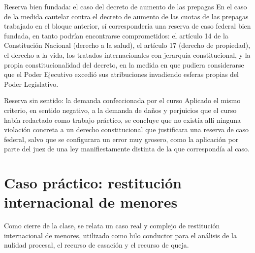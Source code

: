 \documentclass[12pt,oneside]{book}
\begin{document}
\begin{example}{Reserva bien fundada: el caso del decreto de aumento de las prepagas}
En el caso de la medida cautelar contra el decreto de aumento de las cuotas de las prepagas trabajado en el bloque anterior, sí correspondería una reserva de caso federal bien fundada, en tanto podrían encontrarse comprometidos: el artículo 14 de la Constitución Nacional (derecho a la salud), el artículo 17 (derecho de propiedad), el derecho a la vida, los tratados internacionales con jerarquía constitucional, y la propia constitucionalidad del decreto, en la medida en que pudiera considerarse que el Poder Ejecutivo excedió sus atribuciones invadiendo esferas propias del Poder Legislativo.
\end{example}

\begin{example}{Reserva sin sentido: la demanda confeccionada por el curso}
Aplicado el mismo criterio, en sentido negativo, a la demanda de daños y perjuicios que el curso había redactado como trabajo práctico, se concluye que no existía allí ninguna violación concreta a un derecho constitucional que justificara una reserva de caso federal, salvo que se configurara un error muy grosero, como la aplicación por parte del juez de una ley manifiestamente distinta de la que correspondía al caso.
\end{example}

\section{Caso práctico: restitución internacional de menores}

Como cierre de la clase, se relata un caso real y complejo de restitución internacional de menores, utilizado como hilo conductor para el análisis de la nulidad procesal, el recurso de casación y el recurso de queja.
\end{document}

